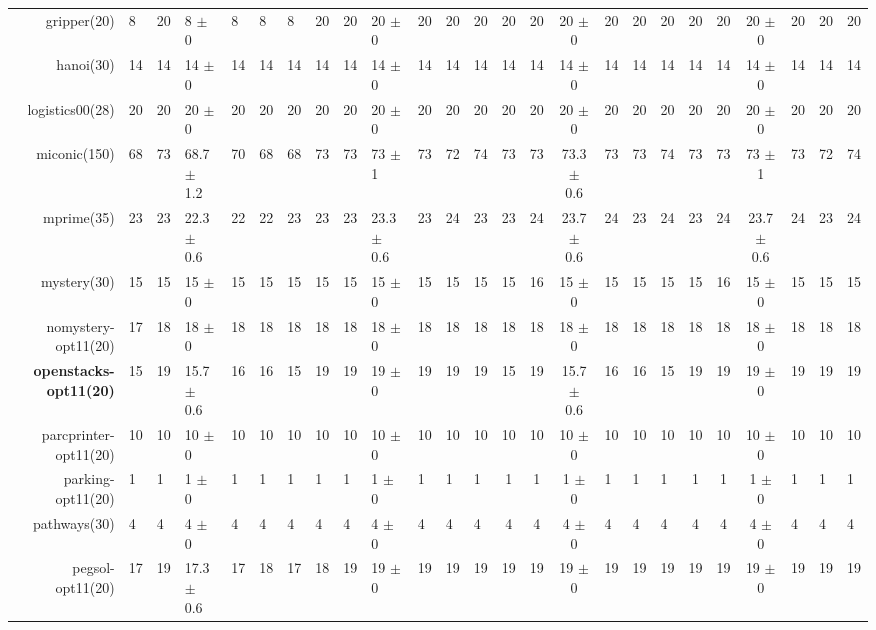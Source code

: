 \begin{center}
\begin{tabular}{|rHHHHHHHHHHHHcccHHH|cccHHH|}
gripper(20) & 8 & 20 & 8 \(\pm\) 0 & 8 & 8 & 8 & 20 & 20 & 20 \(\pm\) 0 & 20 & 20 & 20 & 20 & 20 & 20 \(\pm\) 0 & 20 & 20 & 20 & 20 & 20 & 20 \(\pm\) 0 & 20 & 20 & 20\\
hanoi(30) & 14 & 14 & 14 \(\pm\) 0 & 14 & 14 & 14 & 14 & 14 & 14 \(\pm\) 0 & 14 & 14 & 14 & 14 & 14 & 14 \(\pm\) 0 & 14 & 14 & 14 & 14 & 14 & 14 \(\pm\) 0 & 14 & 14 & 14\\
logistics00(28) & 20 & 20 & 20 \(\pm\) 0 & 20 & 20 & 20 & 20 & 20 & 20 \(\pm\) 0 & 20 & 20 & 20 & 20 & 20 & 20 \(\pm\) 0 & 20 & 20 & 20 & 20 & 20 & 20 \(\pm\) 0 & 20 & 20 & 20\\
miconic(150) & 68 & 73 & 68.7 \(\pm\) 1.2 & 70 & 68 & 68 & 73 & 73 & 73 \(\pm\) 1 & 73 & 72 & 74 & 73 & 73 & 73.3 \(\pm\) 0.6 & 73 & 73 & 74 & 73 & 73 & 73 \(\pm\) 1 & 73 & 72 & 74\\
mprime(35) & 23 & 23 & 22.3 \(\pm\) 0.6 & 22 & 22 & 23 & 23 & 23 & 23.3 \(\pm\) 0.6 & 23 & 24 & 23 & 23 & 24 & 23.7 \(\pm\) 0.6 & 24 & 23 & 24 & 23 & 24 & 23.7 \(\pm\) 0.6 & 24 & 23 & 24\\
mystery(30) & 15 & 15 & 15 \(\pm\) 0 & 15 & 15 & 15 & 15 & 15 & 15 \(\pm\) 0 & 15 & 15 & 15 & 15 & 16 & 15 \(\pm\) 0 & 15 & 15 & 15 & 15 & 16 & 15 \(\pm\) 0 & 15 & 15 & 15\\
nomystery-opt11(20) & 17 & 18 & 18 \(\pm\) 0 & 18 & 18 & 18 & 18 & 18 & 18 \(\pm\) 0 & 18 & 18 & 18 & 18 & 18 & 18 \(\pm\) 0 & 18 & 18 & 18 & 18 & 18 & 18 \(\pm\) 0 & 18 & 18 & 18\\
\textbf{openstacks-opt11(20)} & 15 & 19 & 15.7 \(\pm\) 0.6 & 16 & 16 & 15 & 19 & 19 & 19 \(\pm\) 0 & 19 & 19 & 19 & 15 & 19 & 15.7 \(\pm\) 0.6 & 16 & 16 & 15 & 19 & 19 & 19 \(\pm\) 0 & 19 & 19 & 19\\
parcprinter-opt11(20) & 10 & 10 & 10 \(\pm\) 0 & 10 & 10 & 10 & 10 & 10 & 10 \(\pm\) 0 & 10 & 10 & 10 & 10 & 10 & 10 \(\pm\) 0 & 10 & 10 & 10 & 10 & 10 & 10 \(\pm\) 0 & 10 & 10 & 10\\
parking-opt11(20) & 1 & 1 & 1 \(\pm\) 0 & 1 & 1 & 1 & 1 & 1 & 1 \(\pm\) 0 & 1 & 1 & 1 & 1 & 1 & 1 \(\pm\) 0 & 1 & 1 & 1 & 1 & 1 & 1 \(\pm\) 0 & 1 & 1 & 1\\
pathways(30) & 4 & 4 & 4 \(\pm\) 0 & 4 & 4 & 4 & 4 & 4 & 4 \(\pm\) 0 & 4 & 4 & 4 & 4 & 4 & 4 \(\pm\) 0 & 4 & 4 & 4 & 4 & 4 & 4 \(\pm\) 0 & 4 & 4 & 4\\
pegsol-opt11(20) & 17 & 19 & 17.3 \(\pm\) 0.6 & 17 & 18 & 17 & 18 & 19 & 19 \(\pm\) 0 & 19 & 19 & 19 & 19 & 19 & 19 \(\pm\) 0 & 19 & 19 & 19 & 19 & 19 & 19 \(\pm\) 0 & 19 & 19 & 19\\

\end{tabular}
\end{center}
